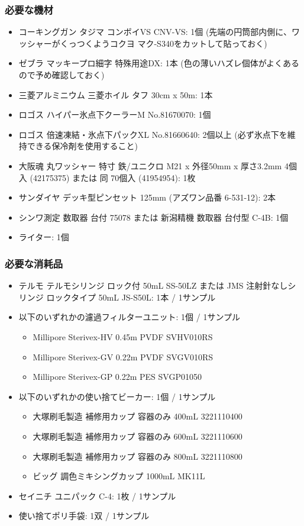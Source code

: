 \documentclass[titlepage,10pt,a4paper,uplatex]{jsbook}
\begin{document}
\subsubsection{必要な機材}
\begin{itemize}
\item コーキングガン タジマ コンボイVS CNV-VS: 1個 (先端の円筒部内側に、ワッシャーがくっつくようコクヨ マク-S340をカットして貼っておく)
\item ゼブラ マッキープロ細字 特殊用途DX: 1本 (色の薄いハズレ個体がよくあるので予め確認しておく)
\item 三菱アルミニウム 三菱ホイル タフ 30cm x 50m: 1本
\item ロゴス ハイパー氷点下クーラーM No.81670070: 1個
\item ロゴス 倍速凍結・氷点下パックXL No.81660640: 2個以上 (必ず氷点下を維持できる保冷剤を使用すること)
\item 大阪魂 丸ワッシャー 特寸 鉄/ユニクロ M21 x 外径50mm x 厚さ3.2mm 4個入 (42175375) または 同 70個入 (41954954): 1枚
\item サンダイヤ デッキ型ピンセット 125mm (アズワン品番 6-531-12): 2本
\item シンワ測定 数取器 台付 75078 または 新潟精機 数取器 台付型 C-4B: 1個
\item ライター: 1個
\end{itemize}

\subsubsection{必要な消耗品}
\begin{itemize}
\item テルモ テルモシリンジ ロック付 50mL SS-50LZ または JMS 注射針なしシリンジ ロックタイプ 50mL JS-S50L: 1本 / 1サンプル
\item 以下のいずれかの濾過フィルターユニット: 1個 / 1サンプル
\begin{itemize}
\item Millipore Sterivex-HV 0.45{\textmu}m PVDF SVHV010RS
\item Millipore Sterivex-GV 0.22{\textmu}m PVDF SVGV010RS
\item Millipore Sterivex-GP 0.22{\textmu}m PES SVGP01050
\end{itemize}
\item 以下のいずれかの使い捨てビーカー: 1個 / 1サンプル
\begin{itemize}
\item 大塚刷毛製造 補修用カップ 容器のみ 400mL 3221110400
\item 大塚刷毛製造 補修用カップ 容器のみ 600mL 3221110600
\item 大塚刷毛製造 補修用カップ 容器のみ 800mL 3221110800
\item ビッグ 調色ミキシングカップ 1000mL MK11L
\end{itemize}
\item セイニチ ユニパック C-4: 1枚 / 1サンプル
\item 使い捨てポリ手袋: 1双 / 1サンプル
\end{itemize}
\end{document}
